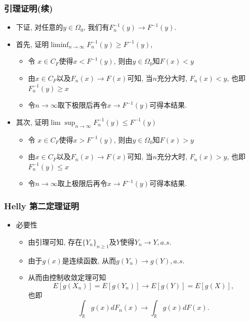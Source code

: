 \documentclass[Prob-All.tex]{subfiles}
\begin{document}
\begin{frame}
	\frametitle{引理证明(续)}
	\begin{itemize}[<+-|alert@+>]

		 \item 下证, 对任意的$y \in \Omega_{0}$, 我们有$F_{n}^{-1}(y) \rightarrow F^{-1}(y)$.
		 \item 首先, 证明${\liminf _{n \rightarrow \infty} F_{n}^{-1}(y) \geq F^{-1}(y)}$,
		 \begin{itemize}[<+-|alert@+>]
		 \item 令 $x\in C_F$使得$x<F^{-1}(y)$, 则由$y\in \Omega_0$知$F(x)<y$
		 \item 由$x\in C_F$以及$F_n(x)\rightarrow F(x)$可知, 当$n$充分大时, $F_n(x)<y$, 也即 $F_n^{-1}(y)\geq x$
		 \item 令$n\rightarrow\infty$取下极限后再令$x\rightarrow F^{-1}(y)$可得本结果.
		 \end{itemize}
		 \item 其次, 证明${\lim \sup _{n \rightarrow \infty} F_{n}^{-1}(y) \leq F^{-1}(y)}$
		 \begin{itemize}[<+-|alert@+>]
			\item 令 $x\in C_F$使得$x>F^{-1}(y)$, 则由$y\in \Omega_0$知$F(x)>y$
			\item 由$x\in C_F$以及$F_n(x)\rightarrow F(x)$可知, 当$n$充分大时, $F_n(x)>y$, 也即 $F_n^{-1}(y)\leq x$
			\item 令$n\rightarrow\infty$取上极限后再令$x\rightarrow F^{-1}(y)$可得本结果.
		 \end{itemize}


		\end{itemize}
\end{frame}


\begin{frame}
	\frametitle{{\rm Helly} 第二定理证明}
	\begin{itemize}[<+-|alert@+>]
	\item 必要性
	\begin{itemize}[<+-|alert@+>]
		\item 由引理可知, 存在$\{Y_n\}_{n\geq 1}$及$Y$使得$Y_n\rightarrow Y,    a.s.$
		\item 由于$g(x)$是连续函数, 从而$g(Y_n)\rightarrow g(Y), a.s.$
		\item 从而由控制收敛定理可知
		\[E[g(X_n)]=E[g(Y_n)]\rightarrow E[g(Y)]=E[g(X)], \]
		\pause 也即
	   \[\int_{\mathbb{R}}g(x)dF_n(x)\rightarrow\int_{\mathbb{R}}g(x)dF(x).\]
	\end{itemize}

	\end{itemize}



\end{frame}
\end{document}
